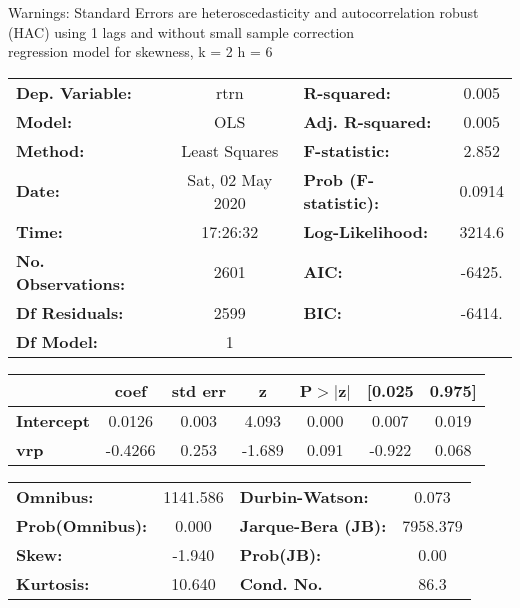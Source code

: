Warnings: \newline
 [1] Standard Errors are heteroscedasticity and autocorrelation robust (HAC) using 1 lags and without small sample correction\\ 

regression model for skewness, k = 2 h = 6\begin{center}
\begin{tabular}{lclc}
\toprule
\textbf{Dep. Variable:}    &       rtrn       & \textbf{  R-squared:         } &     0.005   \\
\textbf{Model:}            &       OLS        & \textbf{  Adj. R-squared:    } &     0.005   \\
\textbf{Method:}           &  Least Squares   & \textbf{  F-statistic:       } &     2.852   \\
\textbf{Date:}             & Sat, 02 May 2020 & \textbf{  Prob (F-statistic):} &   0.0914    \\
\textbf{Time:}             &     17:26:32     & \textbf{  Log-Likelihood:    } &    3214.6   \\
\textbf{No. Observations:} &        2601      & \textbf{  AIC:               } &    -6425.   \\
\textbf{Df Residuals:}     &        2599      & \textbf{  BIC:               } &    -6414.   \\
\textbf{Df Model:}         &           1      & \textbf{                     } &             \\
\bottomrule
\end{tabular}
\begin{tabular}{lcccccc}
                   & \textbf{coef} & \textbf{std err} & \textbf{z} & \textbf{P$> |$z$|$} & \textbf{[0.025} & \textbf{0.975]}  \\
\midrule
\textbf{Intercept} &       0.0126  &        0.003     &     4.093  &         0.000        &        0.007    &        0.019     \\
\textbf{vrp}       &      -0.4266  &        0.253     &    -1.689  &         0.091        &       -0.922    &        0.068     \\
\bottomrule
\end{tabular}
\begin{tabular}{lclc}
\textbf{Omnibus:}       & 1141.586 & \textbf{  Durbin-Watson:     } &    0.073  \\
\textbf{Prob(Omnibus):} &   0.000  & \textbf{  Jarque-Bera (JB):  } & 7958.379  \\
\textbf{Skew:}          &  -1.940  & \textbf{  Prob(JB):          } &     0.00  \\
\textbf{Kurtosis:}      &  10.640  & \textbf{  Cond. No.          } &     86.3  \\
\bottomrule
\end{tabular}
\end{center}

